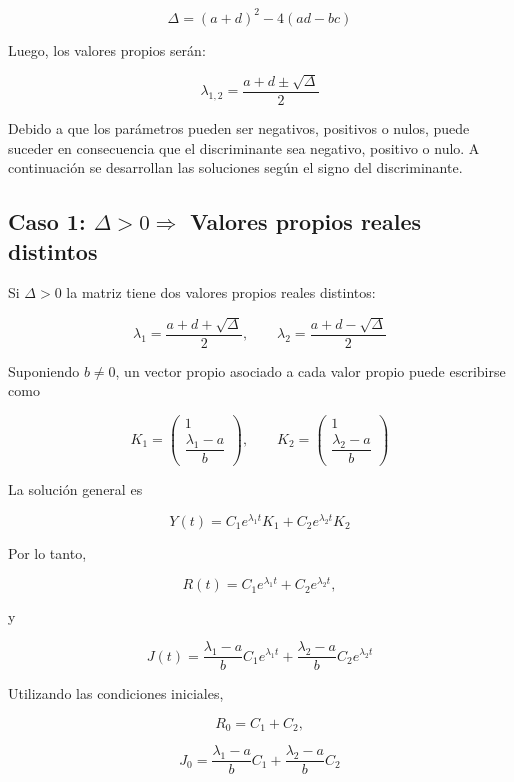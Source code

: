 \documentclass[10pt]{article}
\numberwithin{equation}{section}
\begin{document}
\begin{equation}
\Delta=(a+d)^2-4(ad-bc)
\end{equation}

Luego, los valores propios serán:

\begin{equation}
\lambda_{1, 2} = \frac{a + d \pm \sqrt{\Delta}}{2}
\end{equation}

Debido a que los parámetros pueden ser negativos, positivos o nulos, puede suceder en consecuencia que el discriminante sea negativo,
positivo o nulo. A continuación se desarrollan las soluciones según el signo del discriminante.
\subsection{Caso 1: $\Delta > 0 \Rightarrow$ Valores propios reales distintos}

Si $\Delta>0$ la matriz tiene dos valores propios reales distintos:

\[
\lambda_1=
\frac{a+d+\sqrt{\Delta}}{2},
\qquad
\lambda_2=
\frac{a+d-\sqrt{\Delta}}{2}
\]

Suponiendo $b\neq 0$, un vector propio asociado a cada valor propio puede escribirse como

\[
K_1=
\begin{pmatrix}
1\\
\dfrac{\lambda_1-a}{b}
\end{pmatrix},
\qquad
K_2=
\begin{pmatrix}
1\\
\dfrac{\lambda_2-a}{b}
\end{pmatrix}
\]

La solución general es

\[
Y(t)=C_1e^{\lambda_1t}K_1
+C_2e^{\lambda_2t}K_2
\]

Por lo tanto,

\[
R(t)=C_1e^{\lambda_1t}
+C_2e^{\lambda_2t},
\]

y

\[
J(t)=
\frac{\lambda_1-a}{b}C_1e^{\lambda_1t}
+
\frac{\lambda_2-a}{b}C_2e^{\lambda_2t}
\]

Utilizando las condiciones iniciales,

\[
R_0=C_1+C_2,
\]

\[
J_0=
\frac{\lambda_1-a}{b}C_1
+
\frac{\lambda_2-a}{b}C_2
\]
\end{document}
